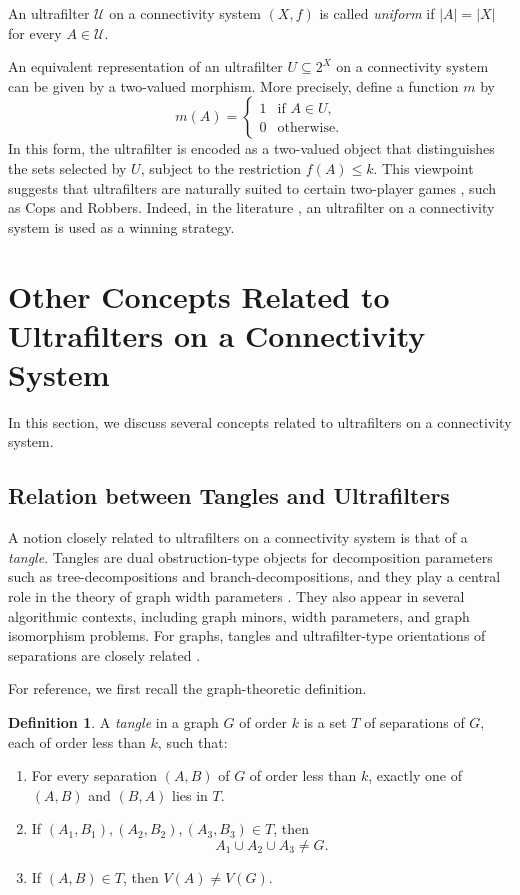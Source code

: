 \documentclass[10pt]{book}
\theoremstyle{definition}
\newtheorem{definition}[theorem]{Definition}
\begin{document}
An ultrafilter \(\mathcal{U}\) on a connectivity system \((X,f)\) is called \emph{uniform} if \(|A|=|X|\) for every \(A\in\mathcal{U}\).

An equivalent representation of an ultrafilter \(U\subseteq 2^X\) on a connectivity system can be given by a two-valued morphism.  
More precisely, define a function \(m\) by
\[
m(A)=
\begin{cases}
1 & \text{if } A\in U,\\
0 & \text{otherwise}.
\end{cases}
\]
In this form, the ultrafilter is encoded as a two-valued object that distinguishes the sets selected by \(U\), subject to the restriction \(f(A)\leq k\).  
This viewpoint suggests that ultrafilters are naturally suited to certain two-player games \cite{254,255}, such as Cops and Robbers.  
Indeed, in the literature \cite{16}, an ultrafilter on a connectivity system is used as a winning strategy.

\section{Other Concepts Related to Ultrafilters on a Connectivity System}

In this section, we discuss several concepts related to ultrafilters on a connectivity system.

\subsection{Relation between Tangles and Ultrafilters}

A notion closely related to ultrafilters on a connectivity system is that of a \emph{tangle}.  
Tangles are dual obstruction-type objects for decomposition parameters such as tree-decompositions and branch-decompositions, and they play a central role in the theory of graph width parameters \cite{albrechtsen2023refining,diestel2021point}.  
They also appear in several algorithmic contexts, including graph minors, width parameters, and graph isomorphism problems.  
For graphs, tangles and ultrafilter-type orientations of separations are closely related \cite{fujitaultrafilter}.

For reference, we first recall the graph-theoretic definition.

\begin{definition}\cite{Robertson1991}
A \emph{tangle} in a graph \(G\) of order \(k\) is a set \(T\) of separations of \(G\), each of order less than \(k\), such that:
\begin{enumerate}
    \item[(T1)] For every separation \((A,B)\) of \(G\) of order less than \(k\), exactly one of \((A,B)\) and \((B,A)\) lies in \(T\).
    \item[(T2)] If \((A_1,B_1), (A_2,B_2), (A_3,B_3) \in T\), then
    \[
    A_1 \cup A_2 \cup A_3 \neq G.
    \]
    \item[(T3)] If \((A,B)\in T\), then \(V(A)\neq V(G)\).
\end{enumerate}
\end{definition}
\end{document}
